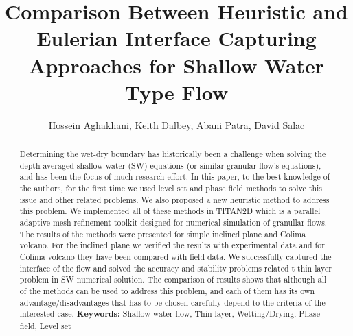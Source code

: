 \documentclass[letterpaper,10pt]{article}
\title{Comparison Between Heuristic and Eulerian Interface Capturing Approaches for Shallow Water Type Flow}
\author{Hossein Aghakhani, Keith Dalbey, Abani Patra, David Salac}
\date{}
\begin{document}
\maketitle

\begin {abstract}{
Determining the wet-dry boundary has historically been a challenge when 
solving the depth-averaged shallow-water (SW) equations (or similar granular flow's equations), and has 
been the focus of much research effort. In this paper, to the best knowledge of the authors, for the first time we used level set and phase field methods to solve this issue and other related problems. We also proposed a new heuristic method to address this problem. We implemented all of these methods in TITAN2D which is a parallel adaptive mesh refinement toolkit designed for numerical simulation of granullar flows.\newline
The results of the methods were presented for simple inclined plane and Colima volcano. For the inclined plane we verified the results with experimental data and for Colima volcano they have been compared with field data. We successfully captured the interface of the flow and solved the accuracy and stability problems related t thin layer problem in SW numerical solution. The comparison of results shows that although all of the methods can be used to address this problem, and each of them has its own advantage/disadvantages that has to be chosen carefully depend to the criteria of the interested case.\newline
\textbf{Keywords:} Shallow water flow, Thin layer, Wetting/Drying, Phase field, Level set}
\end{abstract}

\end{document}
